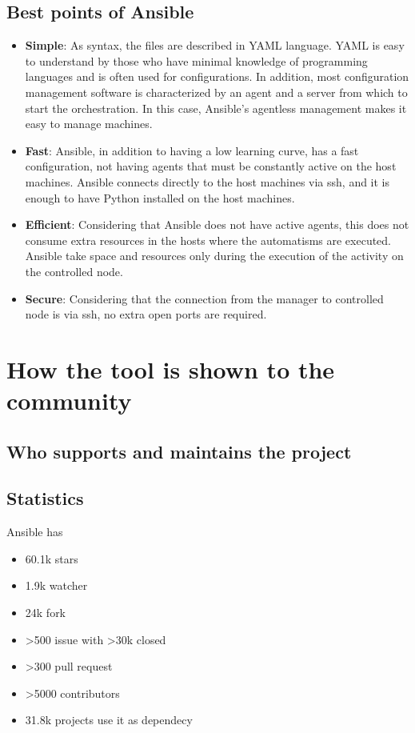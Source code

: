 \documentclass[12pt,a4paper,openright,twoside]{book}
\begin{document}
\subsection{Best points of Ansible}
\begin{itemize}
    \item \textbf{Simple}: As syntax, the files are described in YAML language. YAML is easy to understand by those who have minimal knowledge of programming languages and is often used for configurations. In addition, most configuration management software is characterized by an agent and a server from which to start the orchestration. In this case, Ansible's agentless management makes it easy to manage machines.
    \item \textbf{Fast}: Ansible, in addition to having a low learning curve, has a fast configuration, not having agents that must be constantly active on the host machines. Ansible connects directly to the host machines via ssh, and it is enough to have Python installed on the host machines.
    \item \textbf{Efficient}: Considering that Ansible does not have active agents, this does not consume extra resources in the hosts where the automatisms are executed. Ansible take space and resources only during the execution of the activity on the controlled node.
    \item \textbf{Secure}: Considering that the connection from the manager to controlled node is via ssh, no extra open ports are required.
\end{itemize}

\section{How the tool is shown to the community}

\subsection{Who supports and maintains the project}

\subsection{Statistics}
Ansible has 
\begin{itemize}
    \item 60.1k stars
    \item 1.9k watcher
    \item 24k fork
    \item >500 issue with >30k closed
    \item >300 pull request
    \item >5000 contributors
    \item 31.8k projects use it as dependecy
\end{itemize}
\end{document}
